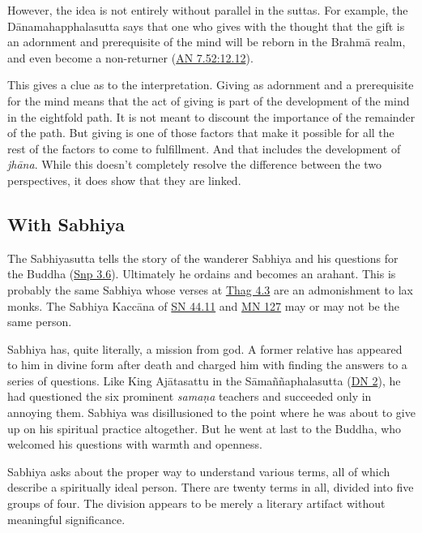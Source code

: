 \documentclass[12pt,openany]{book}%
\begin{document}
However, the idea is not entirely without parallel in the suttas. For example, the \textsanskrit{Dānamahapphalasutta} says that one who gives with the thought that the gift is an adornment and prerequisite of the mind will be reborn in the \textsanskrit{Brahmā} realm, and even become a non-returner (\href{https://suttacentral.net/an7.52/en/sujato\#12.12}{AN 7.52:12.12}).

This gives a clue as to the interpretation. Giving as adornment and a prerequisite for the mind means that the act of giving is part of the development of the mind in the eightfold path. It is not meant to discount the importance of the remainder of the path. But giving is one of those factors that make it possible for all the rest of the factors to come to fulfillment. And that includes the development of \textit{\textsanskrit{jhāna}}. While this doesn’t completely resolve the difference between the two perspectives, it does show that they are linked.

\subsection*{With Sabhiya}

The Sabhiyasutta tells the story of the wanderer Sabhiya and his questions for the Buddha (\href{https://suttacentral.net/snp3.6/en/sujato}{Snp 3.6}). Ultimately he ordains and becomes an arahant. This is probably the same Sabhiya whose verses at \href{https://suttacentral.net/thag4.3/en/sujato}{Thag 4.3} are an admonishment to lax monks. The Sabhiya \textsanskrit{Kaccāna} of \href{https://suttacentral.net/sn44.11/en/sujato}{SN 44.11} and \href{https://suttacentral.net/mn127/en/sujato}{MN 127} may or may not be the same person.

Sabhiya has, quite literally, a mission from god. A former relative has appeared to him in divine form after death and charged him with finding the answers to a series of questions. Like King \textsanskrit{Ajātasattu} in the \textsanskrit{Sāmaññaphalasutta} (\href{https://suttacentral.net/dn2/en/sujato}{DN 2}), he had questioned the six prominent \textit{\textsanskrit{samaṇa}} teachers and succeeded only in annoying them. Sabhiya was disillusioned to the point where he was about to give up on his spiritual practice altogether. But he went at last to the Buddha, who welcomed his questions with warmth and openness.

Sabhiya asks about the proper way to understand various terms, all of which describe a spiritually ideal person. There are twenty terms in all, divided into five groups of four. The division appears to be merely a literary artifact without meaningful significance.
\end{document}
